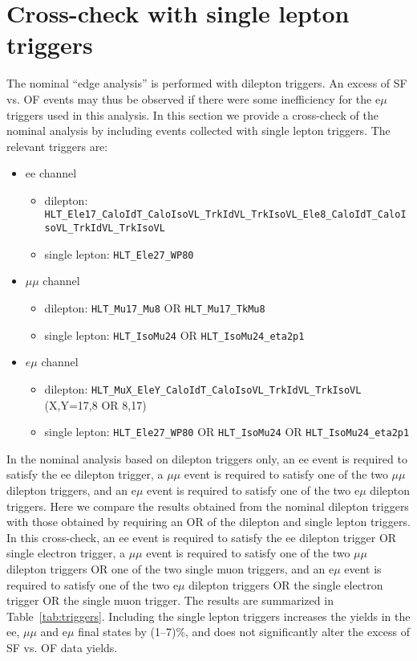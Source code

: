 \section{Cross-check with single lepton triggers}
\label{sec:triggers}

The nominal ``edge analysis'' is performed with dilepton triggers. An excess of SF vs. OF events may thus be observed if there
were some inefficiency for the e$\mu$ triggers used in this analysis. In this section we provide a cross-check of the nominal
analysis by including events collected with single lepton triggers. The relevant triggers are:

\begin{itemize}

\item ee channel
\begin{itemize}
\item dilepton: {\footnotesize \verb=HLT_Ele17_CaloIdT_CaloIsoVL_TrkIdVL_TrkIsoVL_Ele8_CaloIdT_CaloIsoVL_TrkIdVL_TrkIsoVL=}
\item single lepton: \verb=HLT_Ele27_WP80=
\end{itemize}

\item $\mu\mu$ channel
\begin{itemize}
\item dilepton: \verb=HLT_Mu17_Mu8= OR \verb=HLT_Mu17_TkMu8=
\item single lepton: \verb=HLT_IsoMu24= OR \verb=HLT_IsoMu24_eta2p1=
\end{itemize}

\item $e\mu$ channel
\begin{itemize}
\item dilepton: \verb=HLT_MuX_EleY_CaloIdT_CaloIsoVL_TrkIdVL_TrkIsoVL= (X,Y=17,8 OR 8,17)
\item single lepton: \verb=HLT_Ele27_WP80= OR \verb=HLT_IsoMu24= OR \verb=HLT_IsoMu24_eta2p1=
\end{itemize}

\end{itemize}


In the nominal analysis based on dilepton triggers only, an ee event is required to satisfy the ee dilepton trigger, a $\mu\mu$ event is required to
satisfy one of the two $\mu\mu$ dilepton triggers, and an e$\mu$ event is required to satisfy one of the two e$\mu$ dilepton triggers. Here we compare
the results obtained from the nominal dilepton triggers with those obtained by requiring an OR of the dilepton and single lepton triggers. In this cross-check,
an ee event is required to satisfy the ee dilepton trigger OR single electron trigger, a $\mu\mu$ event is required to
satisfy one of the two $\mu\mu$ dilepton triggers OR one of the two single muon triggers, and an e$\mu$ event is required to satisfy one of the two e$\mu$ dilepton triggers
OR the single electron trigger OR the single muon trigger. The results are summarized in Table~\ref{tab:triggers}. Including the single lepton triggers increases
the yields in the ee, $\mu\mu$ and e$\mu$ final states by (1--7)\%, and does not significantly alter the excess of SF vs. OF data yields.

